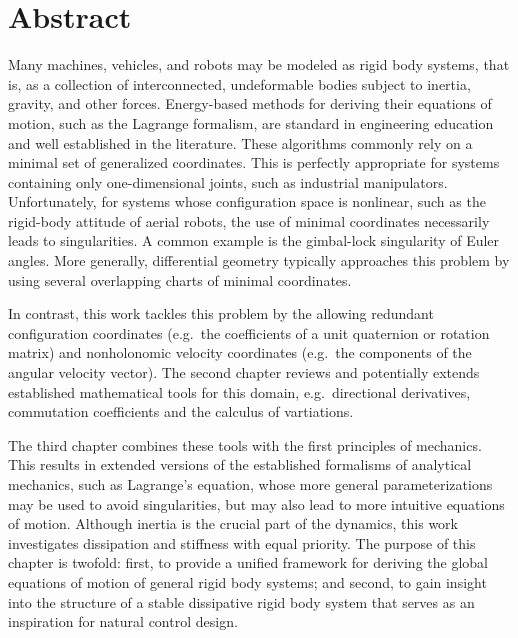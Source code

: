\thispagestyle{plain}
\section*{Abstract}
Many machines, vehicles, and robots may be modeled as rigid body systems, that is, as a collection of interconnected, undeformable bodies subject to inertia, gravity, and other forces.
Energy-based methods for deriving their equations of motion, such as the Lagrange formalism, are standard in engineering education and well established in the literature.
These algorithms commonly rely on a minimal set of generalized coordinates.
This is perfectly appropriate for systems containing only one-dimensional joints, such as industrial manipulators.
Unfortunately, for systems whose configuration space is nonlinear, such as the rigid-body attitude of aerial robots, the use of minimal coordinates necessarily leads to singularities.
A common example is the gimbal-lock singularity of Euler angles.
More generally, differential geometry typically approaches this problem by using several overlapping charts of minimal coordinates.

In contrast, this work tackles this problem by the allowing redundant configuration coordinates (e.g.\ the coefficients of a unit quaternion or rotation matrix) and nonholonomic velocity coordinates (e.g.\ the components of the angular velocity vector).
The second chapter reviews and potentially extends established mathematical tools for this domain, e.g.\ directional derivatives, commutation coefficients and the calculus of vartiations.

The third chapter combines these tools with the first principles of mechanics.
This results in extended versions of the established formalisms of analytical mechanics, such as Lagrange's equation, whose more general parameterizations may be used to avoid singularities, but may also lead to more intuitive equations of motion.
Although inertia is the crucial part of the dynamics, this work investigates dissipation and stiffness with equal priority.
The purpose of this chapter is twofold: 
first, to provide a unified framework for deriving the global equations of motion of general rigid body systems; 
and second, to gain insight into the structure of a stable dissipative rigid body system that serves as an inspiration for natural control design.


